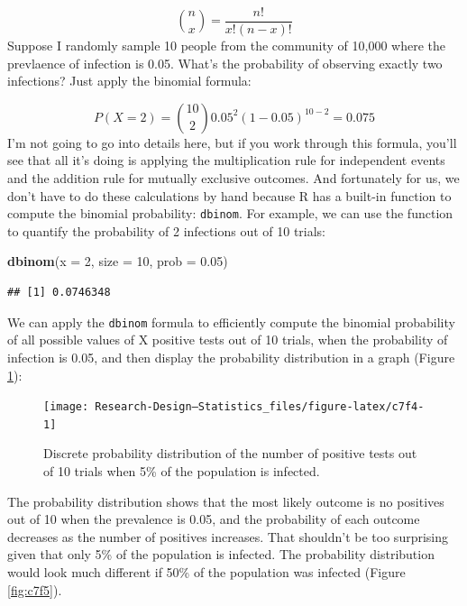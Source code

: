 \documentclass[
]{book}
\newenvironment{Shaded}{\begin{snugshade}}{\end{snugshade}}
\newcommand{\AttributeTok}[1]{\textcolor[rgb]{0.13,0.29,0.53}{#1}}
\newcommand{\DecValTok}[1]{\textcolor[rgb]{0.00,0.00,0.81}{#1}}
\newcommand{\FloatTok}[1]{\textcolor[rgb]{0.00,0.00,0.81}{#1}}
\newcommand{\FunctionTok}[1]{\textcolor[rgb]{0.13,0.29,0.53}{\textbf{#1}}}
\newcommand{\NormalTok}[1]{#1}
\begin{document}
\[
\binom{n}{x} = \frac{n!}{x!(n-x)!}
\]
Suppose I randomly sample 10 people from the community of 10,000 where the prevlaence of infection is 0.05. What's the probability of observing exactly two infections? Just apply the binomial formula:

\[
P(X = 2) = \binom{10}{2} 0.05^2 (1 - 0.05)^{10 - 2}=0.075
\]
I'm not going to go into details here, but if you work through this formula, you'll see that all it's doing is applying the multiplication rule for independent events and the addition rule for mutually exclusive outcomes. And fortunately for us, we don't have to do these calculations by hand because R has a built-in function to compute the binomial probability: \texttt{dbinom}. For example, we can use the function to quantify the probability of 2 infections out of 10 trials:

\begin{Shaded}
\begin{Highlighting}[]
\FunctionTok{dbinom}\NormalTok{(}\AttributeTok{x =} \DecValTok{2}\NormalTok{, }\AttributeTok{size =} \DecValTok{10}\NormalTok{, }\AttributeTok{prob =} \FloatTok{0.05}\NormalTok{)}
\end{Highlighting}
\end{Shaded}

\begin{verbatim}
## [1] 0.0746348
\end{verbatim}

We can apply the \texttt{dbinom} formula to efficiently compute the binomial probability of all possible values of X positive tests out of 10 trials, when the probability of infection is 0.05, and then display the probability distribution in a graph (Figure \ref{fig:c7f4}):

\begin{figure}

{\centering \texttt{[image: Research-Design---Statistics\_files/figure-latex/c7f4-1]} 

}

\caption{Discrete probability distribution of the number of positive tests out of 10 trials when 5\% of the population is infected.}\label{fig:c7f4}
\end{figure}

The probability distribution shows that the most likely outcome is no positives out of 10 when the prevalence is 0.05, and the probability of each outcome decreases as the number of positives increases. That shouldn't be too surprising given that only 5\% of the population is infected. The probability distribution would look much different if 50\% of the population was infected (Figure \ref{fig:c7f5}).
\end{document}
